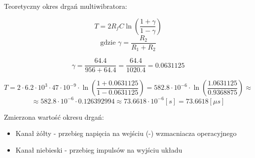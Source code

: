 \documentclass[14pt, table]{extarticle}
\begin{document}
\begin{figure}[H]
    \centering
    \qquad
\end{figure}

\newpage
Teoretyczny okres drgań multiwibratora:

$$ T = 2 R_f C \ln \left( \frac{1 + \gamma}{1 - \gamma} \right) $$
$$ \textrm{gdzie } \gamma = \frac{R_2}{R_1 + R_2} $$

$$ \gamma = \frac{64.4}{956 + 64.4} = \frac{64.4}{1020.4} = 0.0631125 $$

$$ T = 2 \cdot 6.2 \cdot 10^{3} \cdot 47 \cdot 10^{-9} \cdot \ln \left( \frac{1 + 0.0631125}{1 - 0.0631125} \right) = 582.8 \cdot 10^{-6} \cdot \ln \left( \frac{1.0631125}{0.9368875} \right) \approx $$
$$ \approx 582.8 \cdot 10^{-6} \cdot 0.126392994 \approx 73.6618 \cdot 10^{-6} \left[ s \right] = 73.6618 \left[ \mu s \right] $$

\smallskip
Zmierzona wartość okresu drgań: 

\begin{itemize}
	\item Kanał żółty - przebieg napięcia na wejściu (-) wzmacniacza operacyjnego
	\item Kanał niebieski - przebieg impulsów na wyjściu układu
\end{itemize}
\end{document}
